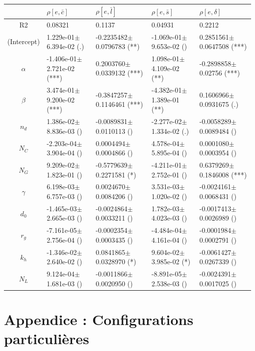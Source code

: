 \begin{center}
\begin{tabular}{|c|p{3.7cm}|p{3.7cm}|p{3.7cm}|p{3.7cm}|}
 \hline
&$\rho[e,\bar{c}]$&$\rho[e,\bar{l}]$&$\rho[e,\bar{s}]$&$\rho[e,\delta]$\\\hline
R2&0.08321&0.1137&0.04931&0.2212\\\hline
(Intercept)&1.229e-01$\pm$6.394e-02 (.)&-0.2235482$\pm$0.0796783 (**)&-1.069e-01$\pm$9.653e-02 ()&0.2851561$\pm$0.0647508 (***)\\
$\alpha$&-1.406e-01$\pm$2.721e-02 (***)&0.2003760$\pm$0.0339132 (***)&1.098e-01$\pm$4.109e-02 (**)&-0.2898858$\pm$0.02756 (***)\\
$\beta$&3.474e-01$\pm$9.200e-02 (***)&-0.3847257$\pm$0.1146461 (***)&-4.382e-01$\pm$1.389e-01 (**)&0.1606966$\pm$0.0931675 (.)\\
$n_d$&1.386e-02$\pm$8.836e-03 ()&-0.0089831$\pm$0.0110113 ()&-2.277e-02$\pm$1.334e-02 (.)&-0.0058289$\pm$0.0089484 ()\\
$N_C$&-2.203e-04$\pm$3.904e-04 ()&0.0004494$\pm$0.0004866 ()&4.578e-04$\pm$5.895e-04 ()&0.0001080$\pm$0.0003954 ()\\
$N_G$&9.209e-02$\pm$1.823e-01 ()&-0.5779639$\pm$0.2271581 (*)&-4.211e-01$\pm$2.752e-01 ()&0.6379269$\pm$0.1846008 (***)\\
$\gamma$&6.198e-03$\pm$6.757e-03 ()&0.0024670$\pm$0.0084206 ()&3.531e-03$\pm$1.020e-02 ()&-0.0024161$\pm$0.0068431 ()\\
$d_0$&-1.465e-03$\pm$2.665e-03 ()&-0.0024864$\pm$0.0033211 ()&1.782e-03$\pm$4.023e-03 ()&-0.0017413$\pm$0.0026989 ()\\
$r_g$&-7.161e-05$\pm$2.756e-04 ()&-0.0002354$\pm$0.0003435 ()&-4.484e-04$\pm$4.161e-04 ()&-0.0001984$\pm$0.0002791 ()\\
$k_h$&-1.346e-02$\pm$2.640e-02 ()&0.0841865$\pm$0.0328970 (*)&9.604e-02$\pm$3.985e-02 (*)&-0.0061427$\pm$0.0267339 ()\\
$N_L$&9.124e-04$\pm$1.681e-03 ()&-0.0011866$\pm$0.0020950 ()&-8.891e-05$\pm$2.538e-03 ()&-0.0024391$\pm$0.0017025 ()\\
\hline
\end{tabular}

\end{center}




\newpage

\section*{Appendice : Configurations particulières}

